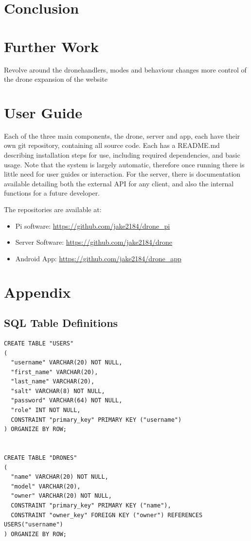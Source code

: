 \documentclass{article}
\begin{document}
\section{Conclusion}



\section{Further Work}
 Revolve around the dronehandlers, modes and behaviour changes
 more control of the drone
 expansion of the website

\section{User Guide}\label{UserGuide}
Each of the three main components, the drone, server and app, each have their own git repository, containing all source code. Each has a README.md describing installation steps for use, including required dependencies, and basic usage. Note that the system is largely automatic, therefore once running there is little need for user guides or interaction. For the server, there is documentation available detailing both the external API for any client, and also the internal functions for a future developer. 

The repositories are available at: 
\begin{itemize}
	\item Pi software: \url{https://github.com/jake2184/drone_pi}
	\item Server Software: \url{https://github.com/jake2184/drone}
	\item Android App: \url{https://github.com/jake2184/drone_app}
\end{itemize}





\section{Appendix}

\subsection{SQL Table Definitions} \label{SQLDefinitions}
\begin{center}
\begin{lstlisting} 
CREATE TABLE "USERS"
(
  "username" VARCHAR(20) NOT NULL,
  "first_name" VARCHAR(20),
  "last_name" VARCHAR(20),
  "salt" VARCHAR(8) NOT NULL,
  "password" VARCHAR(64) NOT NULL,
  "role" INT NOT NULL,
  CONSTRAINT "primary_key" PRIMARY KEY ("username")
) ORGANIZE BY ROW;


CREATE TABLE "DRONES"
(
  "name" VARCHAR(20) NOT NULL,
  "model" VARCHAR(20),
  "owner" VARCHAR(20) NOT NULL,
  CONSTRAINT "primary_key" PRIMARY KEY ("name"),
  CONSTRAINT "owner_key" FOREIGN KEY ("owner") REFERENCES USERS("username")
) ORGANIZE BY ROW;
\end{lstlisting}
\end{center}
\end{document}
